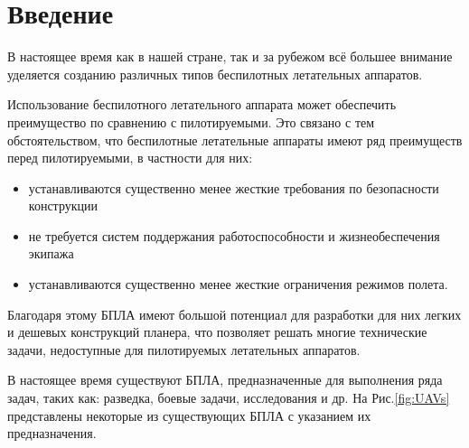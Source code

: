 \chapter*{Введение}

В настоящее время как в нашей стране, так и за рубежом всё большее внимание уделяется созданию различных типов беспилотных летательных аппаратов. 


Использование беспилотного летательного аппарата может обеспечить преимущество по сравнению с пилотируемыми. Это связано с тем обстоятельством, что беспилотные летательные аппараты имеют ряд преимуществ перед пилотируемыми, в частности для них:
\begin{itemize}
\item устанавливаются существенно менее жесткие требования по безопасности конструкции
\item не требуется систем поддержания работоспособности и жизнеобеспечения экипажа
\item устанавливаются существенно менее жесткие ограничения режимов полета.
\end{itemize} 



Благодаря этому БПЛА имеют большой потенциал для разработки для них легких и дешевых конструкций планера, что позволяет решать многие технические задачи, недоступные для пилотируемых летательных аппаратов.

В настоящее время существуют БПЛА, предназначенные для выполнения ряда задач, таких как: разведка, боевые задачи, исследования и др. На Рис.\ref{fig:UAVs} представлены некоторые из существующих БПЛА с указанием их предназначения.  


